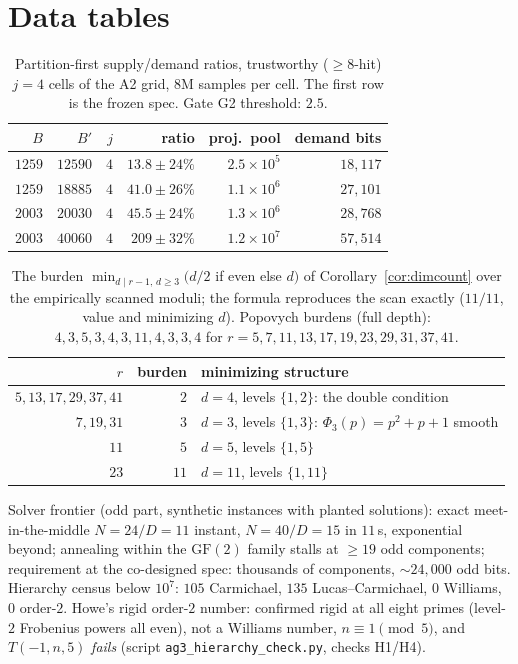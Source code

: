 \documentclass[11pt]{article}
\theoremstyle{remark}
\begin{document}
\appendix

\section{Data tables}\label{app:tables}

\begin{table}[ht]\centering\small
\begin{tabular}{@{}rrrrrr@{}}
\toprule
$B$ & $B'$ & $j$ & ratio & proj.\ pool & demand bits \\
\midrule
$1259$ & $12590$ & $4$ & $13.8 \pm 24\%$ & $2.5\times10^5$ & $18{,}117$ \\
$1259$ & $18885$ & $4$ & $41.0 \pm 26\%$ & $1.1\times10^6$ & $27{,}101$ \\
$2003$ & $20030$ & $4$ & $45.5 \pm 24\%$ & $1.3\times10^6$ & $28{,}768$ \\
$2003$ & $40060$ & $4$ & $209 \pm 32\%$ & $1.2\times10^7$ & $57{,}514$ \\
\bottomrule
\end{tabular}
\caption{Partition-first supply/demand ratios, trustworthy ($\ge 8$-hit)
$j = 4$ cells of the A2 grid, $8$M samples per cell. The first row is the
frozen spec. Gate G2 threshold: $2.5$.}
\label{tab:a2}
\end{table}

\begin{table}[ht]\centering\small
\begin{tabular}{@{}rrl@{}}
\toprule
$r$ & burden & minimizing structure \\
\midrule
$5, 13, 17, 29, 37, 41$ & $2$ & $d = 4$, levels $\{1,2\}$: the double condition \\
$7, 19, 31$ & $3$ & $d = 3$, levels $\{1,3\}$: $\Phi_3(p) = p^2{+}p{+}1$ smooth \\
$11$ & $5$ & $d = 5$, levels $\{1,5\}$ \\
$23$ & $11$ & $d = 11$, levels $\{1,11\}$ \\
\bottomrule
\end{tabular}
\caption{The burden $\min_{d \mid r-1,\,d\ge3}(d/2$ if even else $d)$ of
Corollary~\ref{cor:dimcount} over the empirically scanned moduli; the
formula reproduces the scan exactly ($11/11$, value and minimizing $d$).
Popovych burdens (full depth): $4, 3, 5, 3, 4, 3, 11, 4, 3, 3, 4$ for
$r = 5, 7, 11, 13, 17, 19, 23, 29, 31, 37, 41$.}
\label{tab:burden}
\end{table}

Solver frontier (odd part, synthetic instances with planted solutions):
exact meet-in-the-middle $N = 24 / D = 11$ instant, $N = 40 / D = 15$ in
$11$\,s, exponential beyond; annealing within the $\mathrm{GF}(2)$ family
stalls at $\ge 19$ odd components; requirement at the co-designed spec:
thousands of components, ${\sim}24{,}000$ odd bits. Hierarchy census below
$10^7$: $105$ Carmichael, $135$ Lucas--Carmichael, $0$ Williams, $0$
order-$2$. Howe's rigid order-$2$ number: confirmed rigid at all eight
primes (level-$2$ Frobenius powers all even), not a Williams number,
$n \equiv 1 \pmod 5$, and $T(-1, n, 5)$ \emph{fails} (script
\texttt{ag3\_hierarchy\_check.py}, checks H1/H4).
\end{document}
